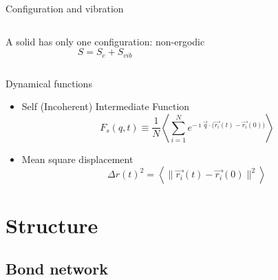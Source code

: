 \begin{frame}{Configuration and vibration}
	\begin{columns}
	\def\svgwidth{\columnwidth}
	\centering\small{}
	
	A solid has only one configuration: non-ergodic
	\[ S = S_c + S_{vib} \]
	\end{columns}
\end{frame}

\begin{frame}{Dynamical functions}
	\begin{itemize}
		\item Self (Incoherent) Intermediate Function
		\[ F_s(q,t) \equiv \frac{1}{N} \left\langle\sum_{i=1}^N e^{-\imath\vec{q}\cdot\bigl(\vec{r_i}(t)-\vec{r_i}(0)\bigr)}\right\rangle \]
		\item Mean square displacement
		\[ \Delta r(t)^2 = \left\langle\| \vec{r_i}(t)-\vec{r_i}(0)\|^2\right\rangle \]
	\end{itemize}
\end{frame}

\section{Structure}
\subsection{Bond network}

